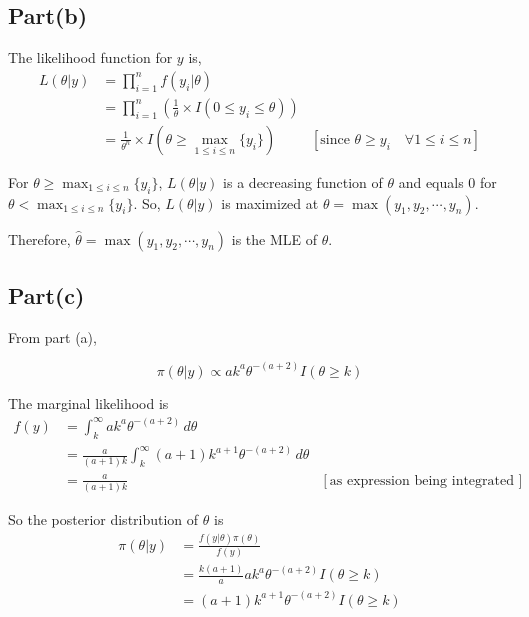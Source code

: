 \documentclass[a4paper]{article}
\begin{document}
\subsection*{Part(b)}
The likelihood function for $y$ is,
\begin{align*}
    L(\theta|y) &= \prod_{i=1}^{n} f(y_i|\theta)\\
    &= \prod_{i=1}^{n} \left(\frac{1}{\theta} \times I(0 \leq y_i \leq \theta)\right)\\
    &= \frac{1}{\theta^n} \times I(\theta \geq \max_{1\leq i \leq n} \{y_i\}) & [\text{since \(\theta \geq y_i \quad \forall 1\leq i \leq n\)}]
\end{align*}

For \(\theta \geq \max_{1\leq i \leq n} \{y_i\}\), \(L(\theta|y)\) is a decreasing function of \(\theta\) and equals 0 for \(\theta < \max_{1\leq i \leq n} \{y_i\}\).
So, \(L(\theta|y)\) is maximized at \(\theta = \max (y_1, y_2, \cdots, y_n)\).
\vspace{0.25cm}

\noindent Therefore, \(\hat{\theta} =  \max (y_1, y_2, \cdots, y_n)\) is the MLE of \(\theta\).

\subsection*{Part(c)}

From part (a),

\[
\pi(\theta|y)  \propto a k^{a} \theta^{-(a+2)} I(\theta \geq k)
\]

\vspace{0.25cm}
The marginal likelihood is 
\begin{align*}
    f(y) &= \int_{k}^{\infty} a k^{a} \theta^{-(a+2)} \,d\theta\\
        &= \frac{a}{(a+1)k}\int_{k}^{\infty} (a+1) k^{a+1} \theta^{-(a+2)} \,d\theta\\
        &= \frac{a}{(a+1)k} & \left[\text{as expression being integrated is pdf of Pareto distribution}\right]
\end{align*}

So the posterior distribution of \(\theta\) is 
\begin{align*}
    \pi(\theta|y) &= \frac{f(y|\theta)\pi(\theta)}{f(y)}\\ 
    &= \frac{k(a+1)}{a} a k^{a} \theta^{-(a+2)} I(\theta \geq k)\\
    &= (a+1) k^{a+1} \theta^{-(a+2)} I(\theta \geq k)\\
\end{align*}
\end{document}

